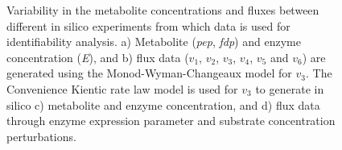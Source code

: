\documentclass[10pt]{article}
\begin{document}
\begin{figure}[!tbhp]
	\caption{}\label{fig:v3_var_1_2_ck_ident}
\end{figure}


\begin{figure}[!tbhp]
	\caption{Variability in the metabolite concentrations and fluxes between different in silico experiments from which data is used for identifiability analysis. a) Metabolite (\textit{pep}, \textit{fdp}) and enzyme concentration (\textit{E}), and b) flux data ($v_1$, $v_2$, $v_3$, $v_4$, $v_5$ and $v_6$) are generated using the Monod-Wyman-Changeaux model for $v_3$. The Convenience Kientic rate law model is used for $v_3$ to generate in silico c) metabolite and enzyme concentration, and d) flux data through enzyme expression parameter and substrate concentration perturbations.}\label{fig:experimental_data_dist}
\end{figure}	
\end{document}
